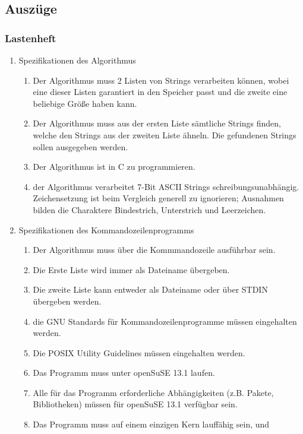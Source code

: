 \subsection{Auszüge}
\subsubsection{Lastenheft}
\renewcommand{\labelenumii}{\theenumii}
\renewcommand{\theenumii}{\theenumi.\arabic{enumii}.}
\label{auszug:lastenheft}
\begin{enumerate}
	\item Spezifikationen des Algorithmus
	\begin{enumerate}
		\item Der Algorithmus muss 2 Listen von Strings verarbeiten können,
		wobei eine dieser Listen garantiert in den Speicher passt und die zweite
		eine beliebige Größe haben kann.
		\item Der Algorithmus muss aus der ersten Liste sämtliche Strings finden,
		welche den Strings aus der zweiten Liste ähneln. Die gefundenen Strings
		sollen ausgegeben werden.
		\item Der Algorithmus ist in C zu programmieren.
		\item der Algorithmus verarbeitet 7-Bit ASCII Strings schreibungsunabhängig. Zeichensetzung
		ist beim Vergleich generell zu ignorieren; Ausnahmen bilden die
		Charaktere Bindestrich, Unterstrich und Leerzeichen.
	\end{enumerate}
	\item Spezifikationen des Kommandozeilenprogramms
	\begin{enumerate}
		\item Der Algorithmus muss über die Kommmandozeile ausführbar sein.
		\item Die Erste Liste wird immer als Dateiname übergeben.
		\item Die zweite Liste kann entweder als Dateiname oder über STDIN übergeben werden.
		\item die GNU Standards für Kommandozeilenprogramme müssen eingehalten werden.
		\item Die POSIX Utility Guidelines müssen eingehalten werden.
		\item Das Programm muss unter openSuSE 13.1 laufen.
		\item Alle für das Programm erforderliche Abhängigkeiten
		(z.B. Pakete, Bibliotheken) müssen für openSuSE 13.1 verfügbar sein.
		\item Das Programm muss auf einem einzigen Kern lauffähig sein, und

\end{enumerate}
\end{enumerate}
